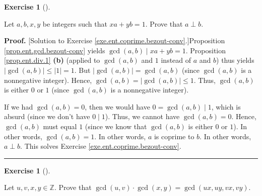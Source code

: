 \documentclass[numbers=enddot,12pt,final,onecolumn,notitlepage]{scrartcl}%
\newcounter{exer}
\numberwithin{exer}{subsection}
\theoremstyle{definition}
\newtheorem{exmp}[exer]{Exercise}
\newenvironment{exercise}[1][]
{\begin{exmp}[#1]\begin{leftbar}}
{\end{leftbar}\end{exmp}}
\newenvironment{fineprint}{\begin{small}}{\end{small}}
\newenvironment{proof}[1][Proof]{\noindent\textbf{#1.} }{\ \rule{0.5em}{0.5em}}
\begin{document}
\begin{exercise}
\label{exe.ent.coprime.bezout-conv} Let $a, b, x, y$ be integers such that $xa
+ yb = 1$. Prove that $a \perp b$.
\end{exercise}

\begin{fineprint}
\begin{proof}
[Solution to Exercise \ref{exe.ent.coprime.bezout-conv}.]Proposition
\ref{prop.ent.gcd.bezout-conv} yields $\gcd\left(  a, b \right)  \mid xa + yb
= 1$. Proposition \ref{prop.ent.div.1} \textbf{(b)} (applied to $\gcd\left(
a, b \right)  $ and $1$ instead of $a$ and $b$) thus yields $\left|
\gcd\left(  a, b \right)  \right|  \leq\left|  1 \right|  = 1$. But $\left|
\gcd\left(  a, b \right)  \right|  = \gcd\left(  a, b \right)  $ (since
$\gcd\left(  a, b \right)  $ is a nonnegative integer). Hence, $\gcd\left(  a,
b \right)  = \left|  \gcd\left(  a, b \right)  \right|  \leq1$. Thus,
$\gcd\left(  a, b \right)  $ is either $0$ or $1$ (since $\gcd\left(  a, b
\right)  $ is a nonnegative integer).

If we had $\gcd\left(  a, b \right)  = 0$, then we would have $0 = \gcd\left(
a, b \right)  \mid1$, which is absurd (since we don't have $0 \mid1$). Thus,
we cannot have $\gcd\left(  a, b \right)  = 0$. Hence, $\gcd\left(  a, b
\right)  $ must equal $1$ (since we know that $\gcd\left(  a, b \right)  $ is
either $0$ or $1$). In other words, $\gcd\left(  a, b \right)  = 1$. In other
words, $a$ is coprime to $b$. In other words, $a \perp b$. This solves
Exercise \ref{exe.ent.coprime.bezout-conv}.
\end{proof}
\end{fineprint}

\begin{exercise}
\label{exe.ent.coprime.gcd*gcd1}Let $u,v,x,y\in\mathbb{Z}$. Prove that
$\gcd\left(  u,v\right)  \cdot\gcd\left(  x,y\right)  =\gcd\left(
ux,uy,vx,vy\right)  $.
\end{exercise}
\end{document}

